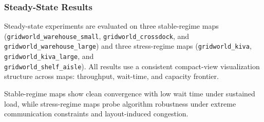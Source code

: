 

\subsubsection*{Steady-State Results}

Steady-state experiments are evaluated on three stable-regime maps \\
(\texttt{gridworld\_warehouse\_small}, \texttt{gridworld\_crossdock}, and
\texttt{gridworld\_warehouse\_large}) and three stress-regime maps
(\texttt{gridworld\_kiva}, \texttt{gridworld\_kiva\_large}, and \\
\texttt{gridworld\_shelf\_aisle}). All results use a consistent compact-view
visualization structure across maps: throughput, wait-time, and capacity
frontier.

Stable-regime maps show clean convergence with low wait time under sustained
load, while stress-regime maps probe algorithm robustness under extreme
communication constraints and layout-induced congestion.

